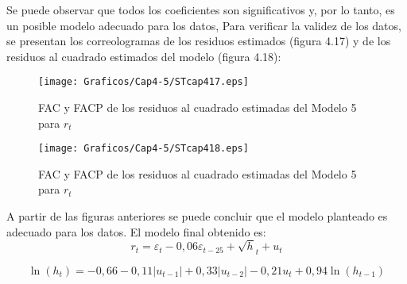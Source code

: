 Se puede observar que todos los coeficientes son significativos y, por lo tanto, es un posible modelo adecuado para los datos, Para verificar la validez de los datos, se presentan los correologramas de los residuos estimados (figura 4.17) y de los residuos al cuadrado estimados del modelo (figura 4.18):

\begin{figure}[H]
\centering
\texttt{[image: Graficos/Cap4-5/STcap417.eps]}
\caption{FAC y FACP de los residuos al cuadrado estimadas del Modelo 5 para $r_{t}$}
\end{figure}

\begin{figure}[H]
\centering
\texttt{[image: Graficos/Cap4-5/STcap418.eps]}
\caption{FAC y FACP de los residuos al cuadrado estimadas del Modelo 5 para $r_{t}$}
\end{figure}

A partir de las figuras anteriores se puede concluir que el modelo planteado 
es adecuado para los datos. El modelo final obtenido es:
\[
r_{t}=\varepsilon_{t}-0,06\varepsilon_{t-25}+\sqrt h_{t} +u_{t}
\]

\[
\ln \left( h_{t} \right)=-0,66-0,11\left| u_{t-1} \right|+0,33\left| u_{t-2} 
\right|-0,21u_{t}+0,94\ln \left( h_{t-1} \right)
\]